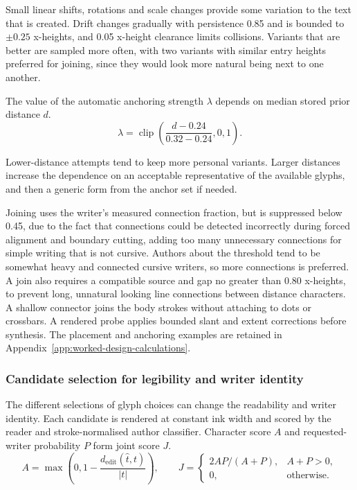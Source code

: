 Small linear shifts, rotations and scale changes provide some variation to the text that is created. Drift changes gradually with persistence 0.85 and is bounded to $\pm0.25$ x-heights, and 0.05 x-height clearance limits collisions. Variants that are better are sampled more often, with two variants with similar entry heights preferred for joining, since they would look more natural being next to one another.

The value of the automatic anchoring strength $\lambda$ depends on median stored prior distance $d$.
\begin{equation}
\lambda=\operatorname{clip}\left(\frac{d-0.24}{0.32-0.24},0,1\right).
\label{eq:des-anchor}
\end{equation}

Lower-distance attempts tend to keep more personal variants. Larger distances increase the dependence on an acceptable representative of the available glyphs, and then a generic form from the anchor set if needed. 

Joining uses the writer's measured connection fraction, but is suppressed below 0.45, due to the fact that connections could be detected incorrectly during forced alignment and boundary cutting, adding too many unnecessary connections for simple writing that is not cursive. Authors about the threshold tend to be somewhat heavy and connected cursive writers, so more connections is preferred. A join also requires a compatible source and gap no greater than 0.80 x-heights, to prevent long, unnatural looking line connections between distance characters. A shallow connector joins the body strokes without attaching to dots or crossbars. A rendered probe applies bounded slant and extent corrections before synthesis. The placement and anchoring examples are retained in Appendix~\ref{app:worked-design-calculations}.

\subsubsection{Candidate selection for legibility and writer identity}
\label{sec:des-selection}
The different selections of glyph choices can change the readability and writer identity. Each candidate is rendered at constant ink width and scored by the reader and stroke-normalised author classifier. Character score $A$ and requested-writer probability $P$ form joint score $J$.
\begin{equation}
A=\max\left(0,1-\frac{d_{\mathrm{edit}}(\widehat t,t)}{|t|}\right),\qquad
J=\begin{cases}2AP/(A+P),&A+P>0,\\0,&\text{otherwise}.\end{cases}
\label{eq:des-jointscore}
\end{equation}

